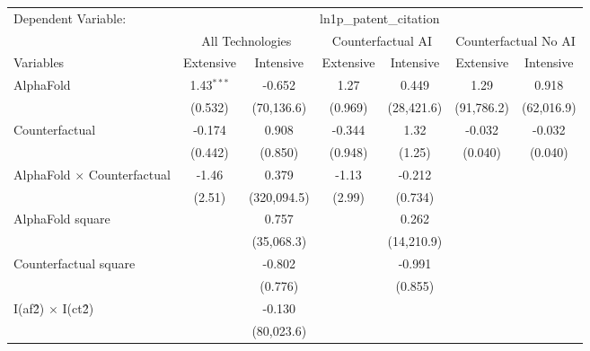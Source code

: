 \begingroup
\centering
\begin{tabular}{lcccccc}
   \tabularnewline \midrule \midrule
   Dependent Variable: & \multicolumn{6}{c}{ln1p\_patent\_citation}\\
 & \multicolumn{2}{c}{All Technologies} & \multicolumn{2}{c}{Counterfactual AI} & \multicolumn{2}{c}{Counterfactual No AI} \\
\cmidrule(lr){1-1}\cmidrule(lr){2-3} \cmidrule(lr){4-5} \cmidrule(lr){6-7}
Variables & \multicolumn{1}{c}{Extensive} & \multicolumn{1}{c}{Intensive} & \multicolumn{1}{c}{Extensive} & \multicolumn{1}{c}{Intensive} & \multicolumn{1}{c}{Extensive} & \multicolumn{1}{c}{Intensive} \\
\cmidrule(lr){1-1}\cmidrule(lr){2-2} \cmidrule(lr){3-3} \cmidrule(lr){4-4} \cmidrule(lr){5-5} \cmidrule(lr){6-6} \cmidrule(lr){7-7}
   AlphaFold                          & 1.43$^{***}$ & -0.652      & 1.27    & 0.449      & 1.29       & 0.918\\   
                                      & (0.532)      & (70,136.6)  & (0.969) & (28,421.6) & (91,786.2) & (62,016.9)\\   
   Counterfactual                     & -0.174       & 0.908       & -0.344  & 1.32       & -0.032     & -0.032\\   
                                      & (0.442)      & (0.850)     & (0.948) & (1.25)     & (0.040)    & (0.040)\\   
   AlphaFold $\times$ Counterfactual  & -1.46        & 0.379       & -1.13   & -0.212     &            &   \\   
                                      & (2.51)       & (320,094.5) & (2.99)  & (0.734)    &            &   \\   
   AlphaFold square                   &              & 0.757       &         & 0.262      &            &   \\   
                                      &              & (35,068.3)  &         & (14,210.9) &            &   \\   
   Counterfactual square              &              & -0.802      &         & -0.991     &            &   \\   
                                      &              & (0.776)     &         & (0.855)    &            &   \\   
   I(af\^2) $\times$ I(ct\^2)         &              & -0.130      &         &            &            &   \\   
                                      &              & (80,023.6)  &         &            &            &   \\   

\end{tabular}
